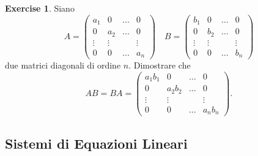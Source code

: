 \documentclass{article}
\theoremstyle{plain}
\theoremstyle{definition}
\newtheorem{xca}[exmp]{Exercise}
\theoremstyle{remark}
\begin{document}
\begin{bxthm}
\begin{xca}
    Siano \[A=\begin{pmatrix}
        a_1&0&\dots&0\\
        0&a_2&\dots&0\\
        \vdots&\vdots&&\vdots\\
        0&0&\dots&a_n
    \end{pmatrix}\quad B=\begin{pmatrix}
        b_1&0&\dots&0\\
        0&b_2&\dots&0\\
        \vdots&\vdots&&\vdots\\
        0&0&\dots&b_n
    \end{pmatrix}\]
    due matrici diagonali di ordine $n$. Dimostrare che 
    \[AB=BA=\begin{pmatrix}
        a_1b_1&0&\dots&0\\
        0&a_2b_2&\dots&0\\
        \vdots&\vdots&&\vdots\\
        0&0&\dots&a_nb_n
    \end{pmatrix}.\]
\end{xca}
\end{bxthm}

\newpage
\subsection{Sistemi di Equazioni Lineari}
\vspace{20pt}
\end{document}
